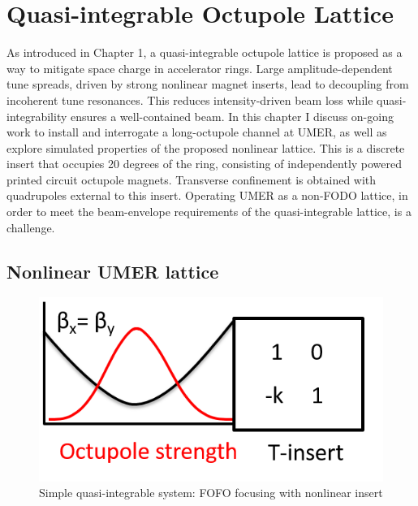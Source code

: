 

\makeatletter
\def\env@matrix{\hskip -\arraycolsep
  \let\@ifnextchar\new@ifnextchar
  \linespread{1}\selectfont
  \renewcommand{\arraystretch}{0.5}%
  \array{*\c@MaxMatrixCols c}}
\makeatother


\renewcommand{\thechapter}{5}

\chapter{Quasi-integrable Octupole Lattice}

As introduced in Chapter 1, a quasi-integrable octupole lattice is proposed as a way to mitigate space charge in accelerator rings. Large amplitude-dependent tune spreads, driven by strong nonlinear magnet inserts, lead to decoupling from incoherent tune resonances. This reduces intensity-driven beam loss while quasi-integrability ensures a well-contained beam. In this chapter I discuss on-going work to install and interrogate a long-octupole channel at UMER, as well as explore simulated properties of the proposed nonlinear lattice. This is a discrete insert that occupies 20 degrees of the ring, consisting of independently powered printed circuit octupole magnets. Transverse confinement is obtained with quadrupoles external to this insert. Operating UMER as a non-FODO lattice, in order to meet the beam-envelope requirements of the quasi-integrable lattice, is a challenge. 






\section{Nonlinear UMER lattice}

\begin{figure}
\centering
\includegraphics[width=.5\textwidth]{gen.figures/toy_model.png}
\caption{Simple quasi-integrable system: FOFO focusing with nonlinear insert }
\label{fig:toymodel}
\end{figure}

